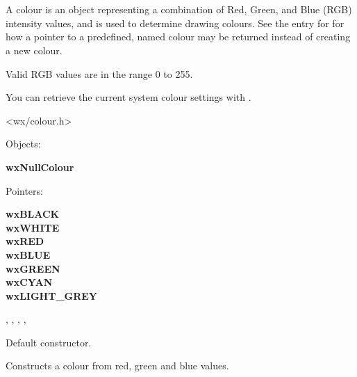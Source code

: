 \section{}\label{wxcolour}

A colour is an object representing a combination of Red, Green, and Blue (RGB) intensity values,
and is used to determine drawing colours. See the
entry for  for how a pointer to a predefined,
named colour may be returned instead of creating a new colour.

Valid RGB values are in the range 0 to 255.

You can retrieve the current system colour settings with .




<wx/colour.h>


Objects:

{\bf wxNullColour}

Pointers:

{\bf wxBLACK\\
wxWHITE\\
wxRED\\
wxBLUE\\
wxGREEN\\
wxCYAN\\
wxLIGHT\_GREY}


, , ,\rtfsp
{}, 



\label{wxcolourconstr}


Default constructor.


Constructs a colour from red, green and blue values.


